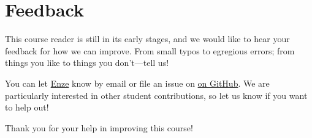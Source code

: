 %

%

\chapter{Feedback} \label{ch:feedback}

This course reader is still in its early stages, and we would like to hear your feedback for how we can improve. 
From small typos to egregious errors; from things you like to things you don't---tell us!

You can let \href{mailto:enze@stanford.edu}{Enze} know by email or file an issue on \href{https://github.com/Enze-Chen/mse_142_cr}{on GitHub}.
We are particularly interested in other student contributions, so let us know if you want to help out!

Thank you for your help in improving this course!
%
